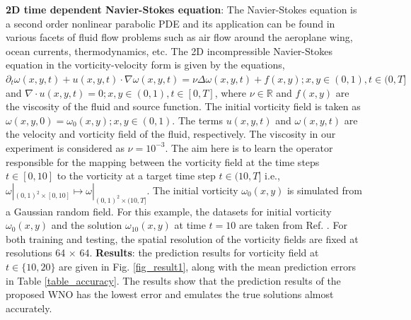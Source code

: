 \documentclass{article}
\begin{document}
\textbf{2D time dependent Navier-Stokes equation}: The Navier-Stokes equation is a second order nonlinear parabolic PDE and its application can be found in various facets of fluid flow problems such as air flow around the aeroplane wing, ocean currents, thermodynamics, etc. The 2D incompressible Navier-Stokes equation in the vorticity-velocity form is given by the equations, $\partial_{t} \omega(x,y, t)+u(x,y, t) \cdot \nabla \omega(x,y, t) =\nu \Delta \omega(x,y, t)+f(x,y); x, y \in(0,1), t \in(0, T]$ and $\nabla \cdot u(x,y, t) =0; x, y \in(0,1), t \in[0, T]$, where $\nu \in \mathbb{R}$ and $f(x,y)$ are the viscosity of the fluid and source function. The initial vorticity field is taken as $\omega(x,y, 0) = \omega_{0}(x,y); x, y \in(0,1)$. The terms $u(x, y, t)$ and $\omega(x, y, t)$ are the velocity and vorticity field of the fluid, respectively. The viscosity in our experiment is considered as $\nu = 10^{-3}$. The aim here is to learn the operator responsible for the mapping between the vorticity field at the time steps $t \in [0, 10]$ to the vorticity at a target time step $t \in (10,T]$ i.e., $\omega |_{(0,1)^2 \times [0,10]} \mapsto \omega |_{(0,1)^2 \times (10,T]}$. The initial vorticity $\omega_0{(x,y)}$ is simulated from a Gaussian random field. For this example, the datasets for initial vorticity $\omega_0{(x,y)}$ and the solution $\omega_{10}{(x,y)}$ at time $t=10$ are taken from Ref. \cite{li2020fourier}. For both training and testing, the spatial resolution of the vorticity fields are fixed at resolutions 64 $\times$ 64. 
\textbf{Results}: the prediction results for vorticity field at $t \in \{10,20\}$ are given in Fig. \ref{fig_result1}, along with the mean prediction errors in Table \ref{table_accuracy}. The results show that the prediction results of the proposed WNO has the lowest error and emulates the true solutions almost accurately.
\end{document}
